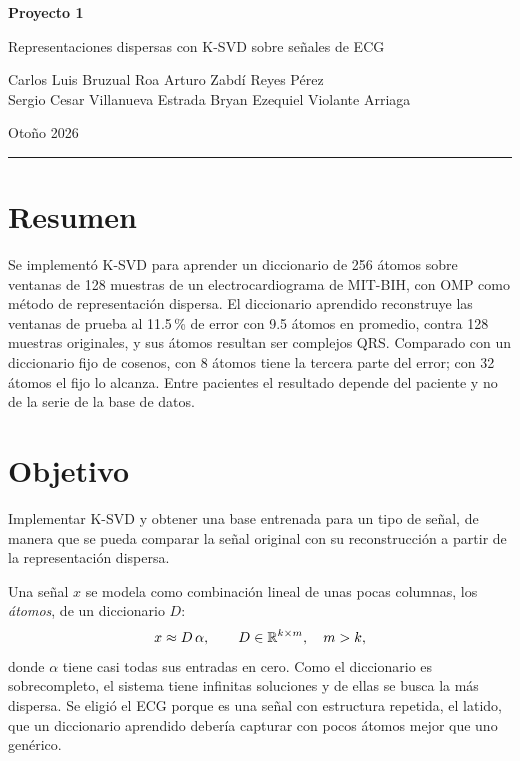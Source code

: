 \documentclass[11pt,letterpaper]{article}
\newcommand{\periodo}{Otoño 2026}
\begin{document}

\begin{center}
  {\LARGE\bfseries Proyecto 1\par}
  \vspace{0.3em}
  {\large Representaciones dispersas con K-SVD sobre señales de
   ECG\par}
  \vspace{0.5em}
  {\small Carlos Luis Bruzual Roa \quad Arturo Zabdí Reyes Pérez\\
   Sergio Cesar Villanueva Estrada \quad Bryan Ezequiel Violante
   Arriaga\par}
  \vspace{0.2em}
  {\small \periodo\par}
  \vspace{0.4em}
  \rule{\linewidth}{0.5pt}
\end{center}

\section*{Resumen}

Se implementó K-SVD para aprender un diccionario de 256 átomos sobre
ventanas de 128 muestras de un electrocardiograma de MIT-BIH, con OMP
como método de representación dispersa. El diccionario aprendido
reconstruye las ventanas de prueba al 11.5\,\% de error con 9.5 átomos
en promedio, contra 128 muestras originales, y sus átomos resultan ser
complejos QRS. Comparado con un diccionario fijo de cosenos, con 8
átomos tiene la tercera parte del error; con 32 átomos el fijo lo
alcanza. Entre pacientes el resultado depende del paciente y no de la
serie de la base de datos.

\section{Objetivo}

Implementar K-SVD y obtener una base entrenada para un tipo de señal,
de manera que se pueda comparar la señal original con su
reconstrucción a partir de la representación dispersa.

Una señal $x$ se modela como combinación lineal de unas pocas
columnas, los \emph{átomos}, de un diccionario $D$:
\[
    x \approx D\,\alpha ,
    \qquad D \in \mathbb{R}^{k \times m},\quad m > k ,
\]
donde $\alpha$ tiene casi todas sus entradas en cero. Como el
diccionario es sobrecompleto, el sistema tiene infinitas soluciones y
de ellas se busca la más dispersa. Se eligió el ECG porque es una
señal con estructura repetida, el latido, que un diccionario aprendido
debería capturar con pocos átomos mejor que uno genérico.
\end{document}
